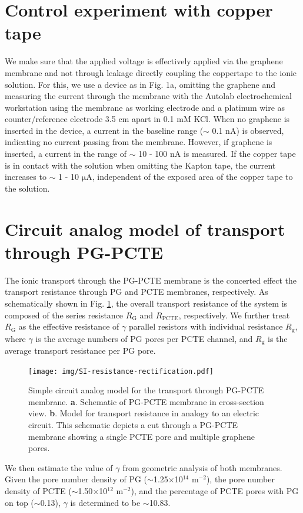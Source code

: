 \documentclass[manuscript=suppinfo,email=true, hyperref=true, keywords=false]{achemso}
\newcommand{\Fig}{Fig.}
\begin{document}
\section{Control experiment with copper tape}
\label{sec:copper}
We make sure that the applied voltage is effectively applied via the
graphene membrane and not through leakage directly coupling the
coppertape to the ionic solution. For this, we use a device as in \Fig
1a, omitting the graphene and measuring the current through the
membrane with the Autolab electrochemical workstation using the
membrane as working electrode and a platinum wire as counter/reference
electrode 3.5 cm apart in 0.1 mM KCl. When no graphene is inserted in
the device, a current in the baseline range ($\sim$ 0.1 nA) is
observed, indicating no current passing from the membrane. However, if
graphene is inserted, a current in the range of $\sim$ 10 - 100 nA is
measured. If the copper tape is in contact with the solution when
omitting the Kapton tape, the current increases to $\sim$ 1 - 10
$\mathrm{\mu}$A, independent of the exposed area of the copper tape to
the solution.

\section{Circuit analog model of transport through PG-PCTE}
\label{sec:R-model}
The ionic transport through the PG-PCTE membrane is the concerted
effect the transport resistance through PG and PCTE membranes,
respectively. As schematically shown in \Fig{} \ref{fig:R-model}, the
overall transport resistance of the system is composed of the series
resistance $R_{\mathrm{G}}$ and $R_{\mathrm{PCTE}}$, respectively. We
further treat $R_{\mathrm{G}}$ as the effective resistance of $\gamma$
parallel resistors with individual resistance $R_{\mathrm{g}}$, where
$\gamma$ is the average numbers of PG pores per PCTE channel, and
$R_{\mathrm{g}}$ is the average transport resistance per PG pore. 
\begin{figure}[htbp]
  \centering
  \texttt{[image: img/SI-resistance-rectification.pdf]}
  \caption{Simple circuit analog model for the transport through
    PG-PCTE membrane. \textbf{a}. Schematic of PG-PCTE membrane in
    cross-section view. \textbf{b}. Model for transport resistance in
    analogy to an electric circuit. This schematic depicts a cut
    through a PG-PCTE membrane showing a single PCTE pore and multiple
    graphene pores.}
  \label{fig:R-model}
\end{figure}
We then estimate the value of $\gamma$ from geometric analysis of both
membranes. Given the pore number density of PG
($\sim$1.25$\times$10$^{14}$ m$^{-2}$), the pore number density of
PCTE ($\sim$1.50$\times$10$^{12}$ m$^{-2}$), and the percentage of
PCTE pores with PG on top ($\sim$0.13), $\gamma$ is determined to be
$\sim$10.83.
\end{document}
